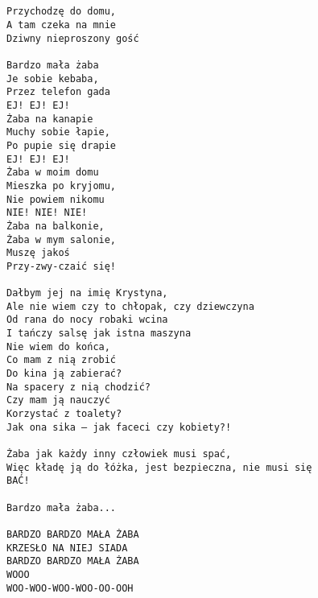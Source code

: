 \documentclass[12pt]{article}
\begin{document}
\subsection*{}
\begin{verbatim}
Przychodzę do domu,
A tam czeka na mnie
Dziwny nieproszony gość

Bardzo mała żaba
Je sobie kebaba,
Przez telefon gada
EJ! EJ! EJ!
Żaba na kanapie
Muchy sobie łapie,
Po pupie się drapie
EJ! EJ! EJ!
Żaba w moim domu
Mieszka po kryjomu,
Nie powiem nikomu
NIE! NIE! NIE!
Żaba na balkonie,
Żaba w mym salonie,
Muszę jakoś
Przy-zwy-czaić się!

Dałbym jej na imię Krystyna,
Ale nie wiem czy to chłopak, czy dziewczyna
Od rana do nocy robaki wcina
I tańczy salsę jak istna maszyna
Nie wiem do końca,
Co mam z nią zrobić
Do kina ją zabierać?
Na spacery z nią chodzić?
Czy mam ją nauczyć
Korzystać z toalety?
Jak ona sika — jak faceci czy kobiety?!

Żaba jak każdy inny człowiek musi spać,
Więc kładę ją do łóżka, jest bezpieczna, nie musi się
BAĆ!

Bardzo mała żaba...

BARDZO BARDZO MAŁA ŻABA
KRZESŁO NA NIEJ SIADA
BARDZO BARDZO MAŁA ŻABA
WOOO
WOO-WOO-WOO-WOO-OO-OOH
\end{verbatim}
\clearpage
\end{document}
